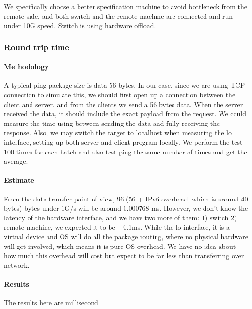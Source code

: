 We specifically choose a better specification machine to avoid bottleneck from the remote side, and both switch and the remote machine are connected and run under 10G speed. Switch is using hardware offload.

\subsubsection{Round trip time}


\paragraph{Methodology}

A typical ping package size is data 56 bytes. In our case, since we are using TCP connection to simulate this, we should first open up a connection between the client and server, and from the clients we send a 56 bytes data. When the server received the data, it should include the exact payload from the request. We could measure the time using between sending the data and fully receiving the response. Also, we may switch the target to localhost when measuring the lo interface, setting up both server and client program locally. We perform the test 100 times for each batch and also test ping the same number of times and get the average.

\paragraph{Estimate}

From the data transfer point of view, 96 (56 + IPv6 overhead, which is around 40 bytes) bytes under 1G/s will be around 0.000768 ms. However, we don't know the latency of the hardware interface, and we have two more of them: 1) switch 2) remote machine, we expected it to be ~ 0.1ms. While the lo interface, it is a virtual device and OS will do all the package routing, where no physical hardware will get involved, which means it is pure OS overhead. We have no idea about how much this overhead will cost but expect to be far less than transferring over network.

\paragraph{Results}

The results here are millisecond

